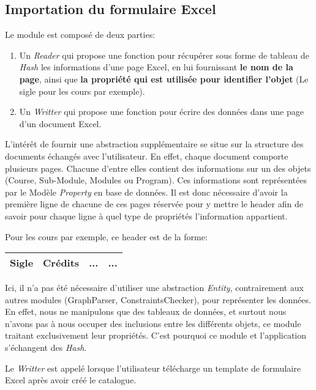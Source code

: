 \subsection{Importation du formulaire Excel}
Le module est composé de deux parties: 
\begin{enumerate}
\item Un \textit{Reader} qui propose une fonction pour récupérer sous forme de tableau de \textit{Hash} les informations d'une page Excel, en lui fournissant \textbf{le nom de la page}, ainsi que \textbf{la propriété qui est utilisée pour identifier l'objet} (Le sigle pour les cours par exemple).
\item Un \textit{Writter} qui propose une fonction pour écrire des données dans une page d'un document Excel.
\end{enumerate}

L'intérêt de fournir une abstraction supplémentaire se situe sur la structure des documents échangés avec l'utilisateur. En effet, chaque document comporte plusieurs pages. Chacune d'entre elles contient des informations sur un des objets (Course, Sub-Module, Modules ou Program). Ces informations sont représentées par le Modèle \textit{Property} en base de données. Il est donc nécessaire d'avoir la première ligne de chacune de ces pages réservée pour y mettre le header afin de savoir pour chaque ligne à quel type de propriétés l'information appartient.

Pour les cours par exemple, ce header est de la forme:
\begin{table}[H]
\centering
\begin{tabular}{| c | c | c | c |}
\hline
\textbf{Sigle} & \textbf{Crédits} & \textbf{...} & \textbf{...}\\
\hline
\end{tabular}  
\end{table}

Ici, il n'a pas été nécessaire d'utiliser une abstraction \textit{Entity}, contrairement aux autres modules (GraphParser, ConstraintsChecker), pour représenter les données. En effet, nous ne manipulons que des tableaux de données, et surtout nous n'avons pas à nous occuper des inclusions entre les différents objets, ce module traitant exclusivement leur propriétés. C'est pourquoi ce module et l'application s'échangent des \textit{Hash}. 


Le \textit{Writter} est appelé lorsque l'utilisateur télécharge un template de formulaire Excel après avoir créé le catalogue. 


